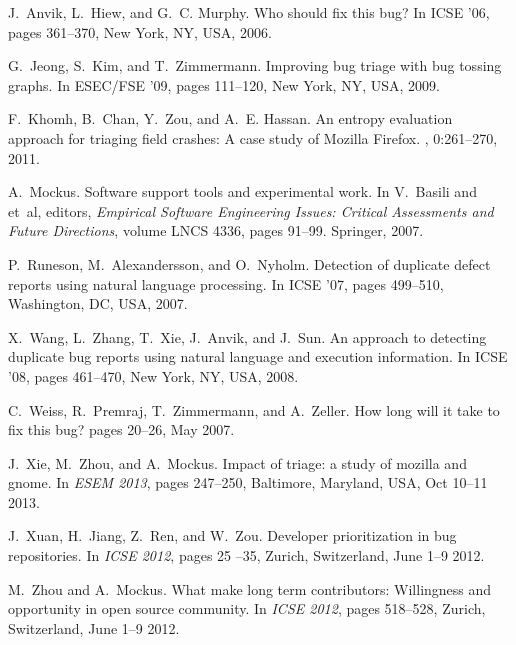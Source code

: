 \documentclass{sig-alternate}
\begin{document}
%
\vspace{-.22cm}
\begin{thebibliography}{10}


J.~Anvik, L.~Hiew, and G.~C. Murphy.
\newblock Who should fix this bug?
\newblock In ICSE '06, pages 361--370, New York, NY, USA, 2006.

G.~Jeong, S.~Kim, and T.~Zimmermann.
\newblock Improving bug triage with bug tossing graphs.
\newblock In ESEC/FSE '09, pages 111--120, New York,
  NY, USA, 2009.

F.~Khomh, B.~Chan, Y.~Zou, and A.~E. Hassan.
\newblock An entropy evaluation approach for triaging field crashes: A case
  study of Mozilla Firefox.
, 0:261--270, 2011.

A.~Mockus.
\newblock Software support tools and experimental work.
\newblock In V.~Basili and et~al, editors, {\em Empirical Software Engineering
  Issues: Critical Assessments and Future Directions}, volume LNCS 4336, pages
  91--99. Springer, 2007.

P.~Runeson, M.~Alexandersson, and O.~Nyholm.
\newblock Detection of duplicate defect reports using natural language
  processing.
\newblock In ICSE '07, pages 499--510, Washington, DC, USA, 2007.

X.~Wang, L.~Zhang, T.~Xie, J.~Anvik, and J.~Sun.
\newblock An approach to detecting duplicate bug reports using natural language
  and execution information.
\newblock In ICSE '08, pages 461--470, New York, NY, USA, 2008.

C.~Weiss, R.~Premraj, T.~Zimmermann, and A.~Zeller.
\newblock How long will it take to fix this bug?
\newblock pages 20--26, May 2007.

J.~Xie, M.~Zhou, and A.~Mockus.
\newblock Impact of triage: a study of mozilla and gnome.
\newblock In {\em ESEM 2013}, pages 247--250, Baltimore, Maryland, USA, Oct
  10--11 2013.

J.~Xuan, H.~Jiang, Z.~Ren, and W.~Zou.
\newblock Developer prioritization in bug repositories.
\newblock In {\em ICSE 2012}, pages 25 --35, Zurich, Switzerland, June 1--9 2012.

M.~Zhou and A.~Mockus.
\newblock What make long term contributors: Willingness and opportunity in open
  source community.
\newblock In {\em ICSE 2012}, pages 518--528, Zurich, Switzerland, June 1--9 2012.

\end{thebibliography}
\end{document}
